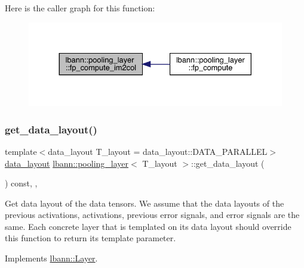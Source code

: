 Here is the caller graph for this function\+:\nopagebreak
\begin{figure}[H]
\begin{center}
\leavevmode
\includegraphics[width=330pt]{classlbann_1_1pooling__layer_a76ce07a190fbe85685ea2ab4e53be7f9_icgraph}
\end{center}
\end{figure}
\mbox{\label{classlbann_1_1pooling__layer_ad6d7e7476521ed4a4c43db493807b2ca}} 
\subsubsection{\texorpdfstring{get\+\_\+data\+\_\+layout()}{get\_data\_layout()}}
{\footnotesize\ttfamily template$<$data\+\_\+layout T\+\_\+layout = data\+\_\+layout\+::\+D\+A\+T\+A\+\_\+\+P\+A\+R\+A\+L\+L\+EL$>$ \\
\hyperlink{base_8hpp_a786677cbfb3f5677b4d84f3056eb08db}{data\+\_\+layout} \hyperlink{classlbann_1_1pooling__layer}{lbann\+::pooling\+\_\+layer}$<$ T\+\_\+layout $>$\+::get\+\_\+data\+\_\+layout (\begin{DoxyParamCaption}{ }\end{DoxyParamCaption}) const\hspace{0.3cm}{\ttfamily [inline]}, {\ttfamily [override]}, {\ttfamily [virtual]}}

Get data layout of the data tensors. We assume that the data layouts of the previous activations, activations, previous error signals, and error signals are the same. Each concrete layer that is templated on its data layout should override this function to return its template parameter. 

Implements \hyperlink{classlbann_1_1Layer_a5dfb66e81fc085997402a5e2241316bd}{lbann\+::\+Layer}.



